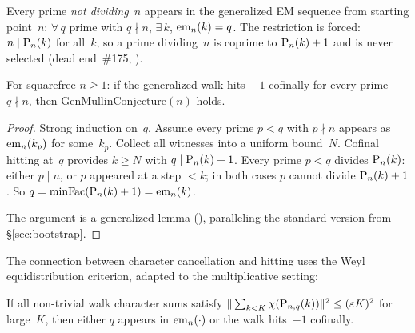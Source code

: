 \begin{definition}
Every prime \emph{not dividing~$n$} appears in the generalized EM
sequence from starting point~$n$: $\forall\, q$ prime with $q \nmid n$,
$\exists\, k$, $\mathrm{em}_{n}(k) = q$.  The restriction is forced: $n \mid
\mathrm{P}_{n}(k)$ for all~$k$, so a prime dividing~$n$ is coprime to
$\mathrm{P}_{n}(k)+1$ and is never selected (dead end~\#175,
).
\end{definition}

\begin{theorem}
\label{thm:gen-mc}
For squarefree $n \geq 1$: if the generalized walk hits~$-1$
cofinally for every prime~$q \nmid n$,
then $\mathrm{GenMullinConjecture}(n)$ holds.
\end{theorem}

\begin{proof}
Strong induction on~$q$.  Assume every prime $p < q$ with $p \nmid n$
appears as $\mathrm{em}_{n}(k_p)$ for some~$k_p$.  Collect all witnesses into
a uniform bound~$N$.  Cofinal hitting at~$q$ provides $k \geq N$ with
$q \mid \mathrm{P}_{n}(k) + 1$.  Every prime $p < q$ divides $\mathrm{P}_{n}(k)$:
either $p \mid n$, or $p$ appeared at a step $< k$; in both cases $p$
cannot divide $\mathrm{P}_{n}(k) + 1$.  So $q = \mathrm{minFac}(\mathrm{P}_{n}(k) + 1) =
\mathrm{em}_{n}(k)$.

The argument is a generalized  lemma
(), paralleling the
standard version from \S\ref{sec:bootstrap}.
\end{proof}

The connection between character cancellation and hitting uses the Weyl
equidistribution criterion, adapted to the multiplicative setting:

\begin{theorem}
\label{thm:weyl-bridge}
If all non-trivial walk character sums satisfy
$\|\sum_{k<K} \chi(\mathrm{P}_{n,q}(k))\|^2 \leq (\varepsilon K)^2$
for large~$K$, then either $q$ appears in $\mathrm{em}_{n}(\cdot)$
or the walk hits~$-1$ cofinally.
\end{theorem}

